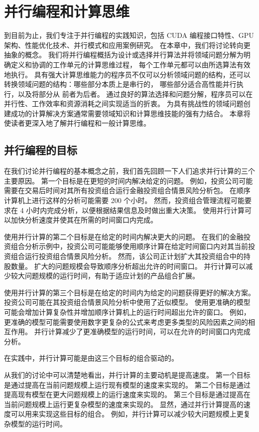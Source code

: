 \section{并行编程和计算思维}
到目前为止，我们专注于并行编程的实践知识，包括 CUDA 编程接口特性、GPU 架构、性能优化技术、并行模式和应用案例研究。 
在本章中，我们将讨论转向更抽象的概念。 
我们将并行编程概括为设计或选择并行算法并将领域问题分解为明确定义和协调的工作单元的计算思维过程，
每个工作单元都可以由所选算法有效地执行。 
具有强大计算思维能力的程序员不仅可以分析领域问题的结构，还可以转换领域问题的结构：哪些部分本质上是串行的，
哪些部分适合高性能并行执行，以及将部分从 前者为后者。 
通过良好的算法选择和问题分解，程序员可以在并行性、工作效率和资源消耗之间实现适当的折衷。 
为具有挑战性的领域问题创建成功的计算解决方案通常需要领域知识和计算思维技能的强有力结合。 
本章将使读者更深入地了解并行编程和一般计算思维。

\subsection{并行编程的目标}
在我们讨论并行编程的基本概念之前，我们首先回顾一下人们追求并行计算的三个主要原因。 
第一个目标是在更短的时间内解决给定的问题。 
例如，投资公司可能需要在交易后时间对其所有投资组合运行金融投资组合情景风险分析包。 
在顺序计算机上进行这样的分析可能需要 200 个小时。 
然而，投资组合管理流程可能要求在 4 小时内完成分析，以便根据结果信息及时做出重大决策。 
使用并行计算可以加快分析速度并使其在所需的时间窗口内完成。

使用并行计算的第二个目标是在给定的时间内解决更大的问题。 
在我们的金融投资组合分析示例中，投资公司可能能够使用顺序计算在给定时间窗口内对其当前投资组合运行投资组合情景风险分析。 
然而，该公司正计划扩大其投资组合中的持股数量。 扩大的问题规模会导致顺序分析超出允许的时间窗口。 
并行计算可以减少较大问题规模的运行时间，有助于适应计划的产品组合扩展。

使用并行计算的第三个目标是在给定的时间内为给定的问题获得更好的解决方案。 
投资公司可能在其投资组合情景风险分析中使用了近似模型。 
使用更准确的模型可能会增加计算复杂性并增加顺序计算机上的运行时间超出允许的窗口。 
例如，更准确的模型可能需要使用数字更复杂的公式来考虑更多类型的风险因素之间的相互作用。 
并行计算减少了更准确模型的运行时间，可以在允许的时间窗口内完成分析。

在实践中，并行计算可能是由这三个目标的组合驱动的。

从我们的讨论中可以清楚地看出，并行计算的主要动机是提高速度。 
第一个目标是通过提高在当前问题规模上运行现有模型的速度来实现的。 
第二个目标是通过提高现有模型在更大问题规模上的运行速度来实现的。 
第三个目标是通过提高在当前问题规模上运行更复杂模型的速度来实现的。 
显然，通过并行计算提高的速度可以用来实现这些目标的组合。 
例如，并行计算可以减少较大问题规模上更复杂模型的运行时间。

